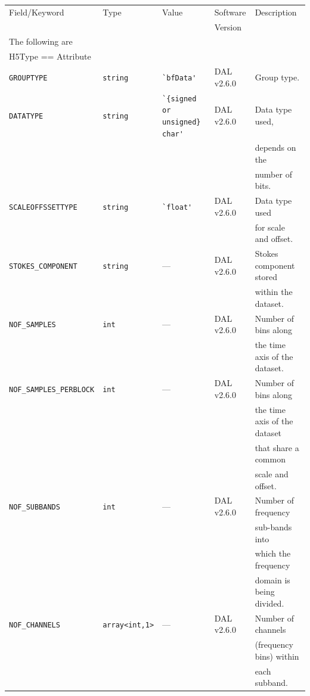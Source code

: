 \documentclass[a4paper,10pt,bibtotoc]{scrartcl}
\begin{document}
\begin{table}[htbp]
  \centering
  \begin{tabular}{|llllp{4.5cm}|}
    \hline
    \sc Field/Keyword  & \sc Type & \sc Value & \sc Software  & Description \\
    \sc   & \sc & \sc & \sc Version  & \\
    \hline \hline
    \sc The following are & \sc & \sc & \sc   &\\
    \sc H5Type == Attribute & \sc & \sc & \sc   &\\
    \hline 
    \small{\verb|GROUPTYPE|}    & \verb|string|  & \verb|`bfData'| & DAL v2.6.0 & Group type. \\
    \small{\verb|DATATYPE |}    & \verb|string|  & \verb|`{signed or unsigned} char'| & DAL v2.6.0 & Data type used,\\
 & & & & depends on the \\
 & & & & number of bits. \\
    \small{\verb|SCALEOFFSSETTYPE |}    & \verb|string|  & \verb|`float'| & DAL v2.6.0 & Data type used\\
 & & & &  for scale and offset.\\
    \small{\verb|STOKES_COMPONENT|}  & \verb|string| & --- & DAL v2.6.0 & Stokes component stored \\
 & & & & within the dataset. \\
    \small{\verb|NOF_SAMPLES|}  & \verb|int| & --- & DAL v2.6.0 & Number of bins along \\
 & & & & the time axis of the dataset. \\
    \small{\verb|NOF_SAMPLES_PERBLOCK|}  & \verb|int| & --- & DAL v2.6.0 & Number of bins along \\
& & & & the time axis of the dataset\\
& & & &  that share a common \\
& & & & scale and offset. \\
    \small{\verb|NOF_SUBBANDS|}  & \verb|int| & --- & DAL v2.6.0 & Number of frequency\\
 & & & &  sub-bands into\\
 & & & &  which the frequency\\
 & & & &  domain is being divided.\\
    \small{\verb|NOF_CHANNELS|}  & \verb|array<int,1>| & --- & DAL v2.6.0 & Number of channels \\
& & & & (frequency bins) within \\
& & & & each subband.\\ 

\end{tabular}
\end{table}
\end{document}
